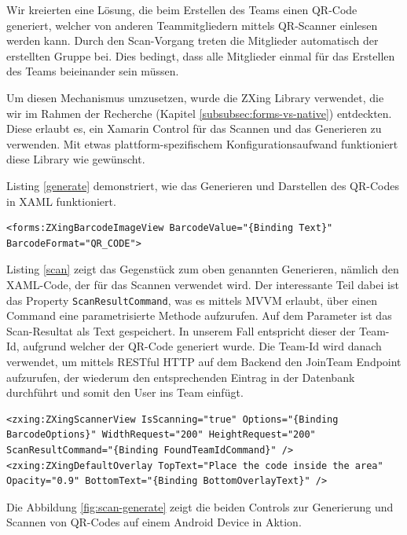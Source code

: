 Wir kreierten eine Lösung, die beim Erstellen des Teams einen QR-Code generiert, welcher von anderen Teammitgliedern mittels QR-Scanner einlesen werden kann. Durch den Scan-Vorgang treten die Mitglieder automatisch der erstellten Gruppe bei. Dies bedingt, dass alle Mitglieder einmal für das Erstellen des Teams beieinander sein müssen. 

Um diesen Mechanismus umzusetzen, wurde die ZXing \cite{zxing.net} Library verwendet, die wir im Rahmen der Recherche (Kapitel \ref{subsubsec:forms-vs-native}) entdeckten. Diese erlaubt es, ein Xamarin Control für das Scannen und das Generieren zu verwenden. Mit etwas plattform-spezifischem Konfigurationsaufwand funktioniert diese Library wie gewünscht.

Listing \ref{generate} demonstriert, wie das Generieren und Darstellen des QR-Codes in XAML funktioniert.


\begin{lstlisting}[label=generate,caption=Verwendung der ZXing Library fürs Generieren des QR-Codes]
<forms:ZXingBarcodeImageView BarcodeValue="{Binding Text}"  BarcodeFormat="QR_CODE">
\end{lstlisting}


Listing \ref{scan} zeigt das Gegenstück zum oben genannten Generieren, nämlich den XAML-Code, der für das Scannen verwendet wird. Der interessante Teil dabei ist das Property \texttt{ScanResultCommand}, was es mittels MVVM erlaubt, über einen Command eine parametrisierte Methode aufzurufen. Auf dem Parameter ist das Scan-Resultat als Text gespeichert. In unserem Fall entspricht dieser der Team-Id, aufgrund welcher der QR-Code generiert wurde. Die Team-Id wird danach verwendet, um mittels RESTful HTTP auf dem Backend den JoinTeam Endpoint aufzurufen, der wiederum den entsprechenden Eintrag in der Datenbank durchführt und somit den User ins Team einfügt.


\begin{lstlisting}[label=scan,caption=XAML fürs Scannen von QR-Codes]
<zxing:ZXingScannerView IsScanning="true" Options="{Binding BarcodeOptions}" WidthRequest="200" HeightRequest="200" ScanResultCommand="{Binding FoundTeamIdCommand}" />
<zxing:ZXingDefaultOverlay TopText="Place the code inside the area" Opacity="0.9" BottomText="{Binding BottomOverlayText}" />
\end{lstlisting}

Die Abbildung \ref{fig:scan-generate} zeigt die beiden Controls  zur Generierung und Scannen von QR-Codes auf einem Android Device in Aktion. 

